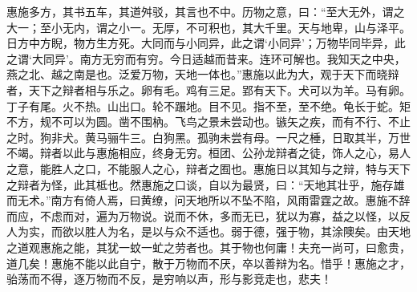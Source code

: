 \documentclass[]{article}
\begin{document}
惠施多方，其书五车，其道舛驳，其言也不中。历物之意，曰：``至大无外，谓之大一；至小无内，谓之小一。无厚，不可积也，其大千里。天与地卑，山与泽平。日方中方睨，物方生方死。大同而与小同异，此之谓`小同异'；万物毕同毕异，此之谓`大同异'。南方无穷而有穷。今日适越而昔来。连环可解也。我知天之中央，燕之北、越之南是也。泛爱万物，天地一体也。''惠施以此为大，观于天下而晓辩者，天下之辩者相与乐之。卵有毛。鸡有三足。郢有天下。犬可以为羊。马有卵。丁子有尾。火不热。山出口。轮不蹍地。目不见。指不至，至不绝。龟长于蛇。矩不方，规不可以为圆。凿不围枘。飞鸟之景未尝动也。镞矢之疾，而有不行、不止之时。狗非犬。黄马骊牛三。白狗黑。孤驹未尝有母。一尺之棰，日取其半，万世不竭。辩者以此与惠施相应，终身无穷。桓团、公孙龙辩者之徒，饰人之心，易人之意，能胜人之口，不能服人之心，辩者之囿也。惠施日以其知与之辩，特与天下之辩者为怪，此其柢也。然惠施之口谈，自以为最贤，曰：``天地其壮乎，施存雄而无术。''南方有倚人焉，曰黄缭，问天地所以不坠不陷，风雨雷霆之故。惠施不辞而应，不虑而对，遍为万物说。说而不休，多而无已，犹以为寡，益之以怪，以反人为实，而欲以胜人为名，是以与众不适也。弱于德，强于物，其涂隩矣。由天地之道观惠施之能，其犹一蚊一虻之劳者也。其于物也何庸！夫充一尚可，曰愈贵，道几矣！惠施不能以此自宁，散于万物而不厌，卒以善辩为名。惜乎！惠施之才，骀荡而不得，逐万物而不反，是穷响以声，形与影竞走也，悲夫！
\end{document}
